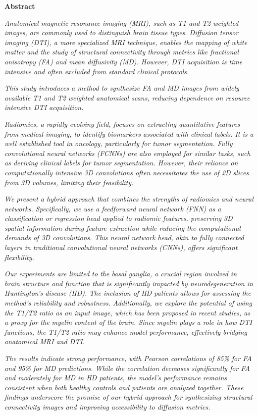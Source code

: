 \thispagestyle{plain}
\begin{center}
    \Large
    \textbf{Abstract}
\end{center}
\textit{Anatomical magnetic resonance imaging (MRI), such as T1 and T2 weighted images, are commonly used to distinguish brain tissue types. Diffusion tensor imaging (DTI), a more specialized MRI technique, enables the mapping of white matter and the study of structural connectivity through metrics like fractional anisotropy (FA) and mean diffusivity (MD). However, DTI acquisition is time intensive and often excluded from standard clinical protocols.}\par
\textit{This study introduces a method to synthesize FA and MD images from widely available T1 and T2 weighted anatomical scans, reducing dependence on resource intensive DTI acquisition.}\par
\textit{Radiomics, a rapidly evolving field, focuses on extracting quantitative features from medical imaging, to identify biomarkers associated with clinical labels. It is a well established tool in oncology, particularly for tumor segmentation. Fully convolutional neural networks (FCNNs) are also employed for similar tasks, such as deriving clinical labels for tumor segmentation. However, their reliance on computationally intensive 3D convolutions often necessitates the use of 2D slices from 3D volumes, limiting their feasibility.}\par
\textit{We present a hybrid approach that combines the strengths of radiomics and neural networks. Specifically, we use a feedforward neural network (FNN) as a classification or regression head applied to radiomic features, preserving 3D spatial information during feature extraction while reducing the computational demands of 3D convolutions. This neural network head, akin to fully connected layers in traditional convolutional neural networks (CNNs), offers significant flexibility.}\par
\textit{Our experiments are limited to the basal ganglia, a crucial region involved in brain structure and function that is significantly impacted by neurodegeneration in Huntington’s disease (HD). The inclusion of HD patients allows for assessing the method's reliability and robustness. Additionally, we explore the potential of using the T1/T2 ratio as an input image, which has been proposed in recent studies, as a proxy for the myelin content of the brain. Since myelin plays a role in how DTI functions, the T1/T2 ratio may enhance model performance, effectively bridging anatomical MRI and DTI.}\par
\textit{The results indicate strong performance, with Pearson correlations of 85\% for FA and 95\% for MD predictions. While the correlation decreases significantly for FA and moderately for MD in HD patients, the model’s performance remains consistent when both healthy controls and patients are analyzed together. These findings underscore the promise of our hybrid approach for synthesizing structural connectivity images and improving accessibility to diffusion metrics.}